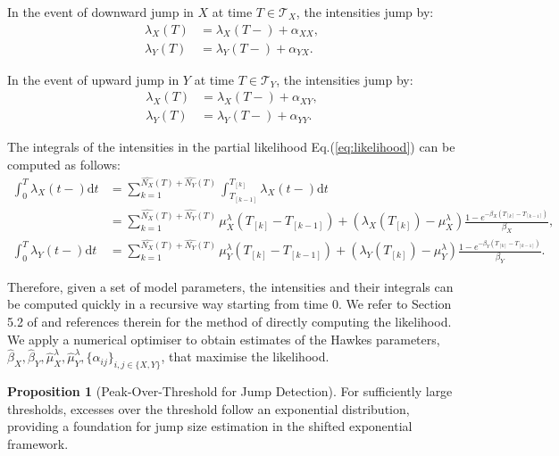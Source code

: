 \documentclass{article}
\newcommand{\diff}{\mathrm{d}}
\theoremstyle{definition}
\newtheorem{proposition}{Proposition}[section]
\begin{document}
In the event of downward jump in $X$ at time $T \in \mathcal{T}_X$, the intensities jump by:
\begin{equation}
   \begin{split}
 \lambda_X(T) &= \lambda_X(T-) + \alpha_{XX},\\
 \lambda_Y(T) &= \lambda_Y(T-) + \alpha_{YX}.
   \end{split}
\end{equation}

In the event of upward jump in $Y$ at time $T \in \mathcal{T}_Y$, the intensities jump by:
\begin{equation}
   \begin{split}
 \lambda_X(T) &= \lambda_X(T-) + \alpha_{XY},\\
 \lambda_Y(T) &= \lambda_Y(T-) + \alpha_{YY}.
   \end{split}
\end{equation}

The integrals of the intensities in the partial likelihood Eq.(\ref{eq:likelihood}) can be computed as follows:
\begin{equation}
   \begin{split}
 \int_0^T\lambda_X(t-)\diff t &= \sum_{k=1}^{\widehat{N_X}(T) + \widehat{N_Y}(T)} \int_{T_{[k-1]}}^{T_{[k]}}\lambda_X(t-)\diff t\\
 &= \sum_{k=1}^{\widehat{N_X}(T) + \widehat{N_Y}(T)} 
\mu_X^\lambda(T_{[k]}-T_{[k-1]})
+\left(\lambda_X(T_{[k]})-\mu_X^\lambda\right)\frac{1-e^{-\beta_X(T_{[k]} - T_{[k-1]})}}{\beta_X},\\ 
\int_0^T\lambda_Y(t-)\diff t&= \sum_{k=1}^{\widehat{N_X}(T) + \widehat{N_Y}(T)} 
\mu_Y^\lambda(T_{[k]}-T_{[k-1]})
+\left(\lambda_Y(T_{[k]})-\mu_Y^\lambda\right)\frac{1-e^{-\beta_Y(T_{[k]} - T_{[k-1]})}}{\beta_Y}.
   \end{split}
\end{equation}

Therefore, given a set of model parameters, the intensities and their integrals can be computed quickly in a recursive way starting from time 0. We refer to Section 5.2 of \cite{laub2021elements} and references therein for the method of directly computing the likelihood.
We apply a numerical optimiser to obtain estimates of the Hawkes parameters, $\hat \beta_X, \hat \beta_Y, \hat \mu_X^\lambda, \hat \mu_Y^\lambda, \{\hat \alpha_{ij}\}_{i,j \in \{X,Y\}}$, that maximise the likelihood.

\begin{proposition}[Peak-Over-Threshold for Jump Detection]
\label{prop:pot}
For sufficiently large thresholds, excesses over the threshold follow an exponential distribution, providing a foundation for jump size estimation in the shifted exponential framework.
\end{proposition}
\end{document}
